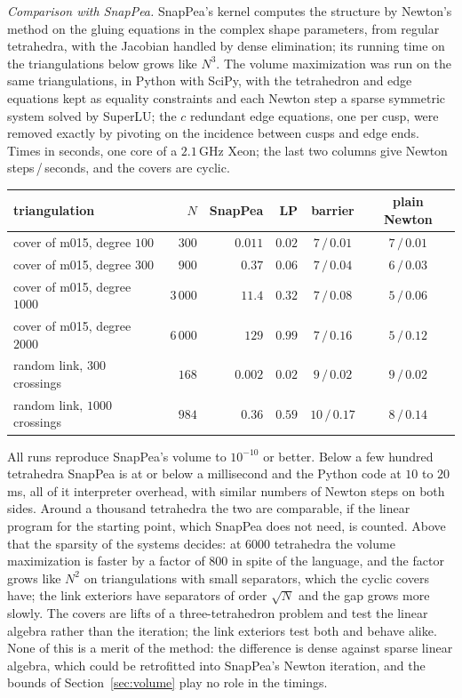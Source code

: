\documentclass[11pt]{amsart}
\theoremstyle{definition}
\theoremstyle{remark}
\begin{document}
\emph{Comparison with SnapPea.} SnapPea's kernel computes the structure by Newton's method on the gluing equations in the complex shape parameters, from regular tetrahedra, with the Jacobian handled by dense elimination; its running time on the triangulations below grows like $N^3$.
The volume maximization was run on the same triangulations, in Python with SciPy, with the tetrahedron and edge equations kept as equality constraints and each Newton step a sparse symmetric system solved by SuperLU; the $c$ redundant edge equations, one per cusp, were removed exactly by pivoting on the incidence between cusps and edge ends. Times in seconds, one core of a $2.1$\,GHz Xeon; the last two columns give Newton steps\,/\,seconds, and the covers are cyclic.

\medskip
\begin{center}
\small
\begin{tabular}{@{}lrrrcc@{}}
\toprule
triangulation & $N$ & SnapPea & LP & barrier & plain Newton\\
\midrule
cover of m015, degree $100$ & $300$ & $0.011$ & $0.02$ & $7\,/\,0.01$ & $7\,/\,0.01$\\
cover of m015, degree $300$ & $900$ & $0.37$ & $0.06$ & $7\,/\,0.04$ & $6\,/\,0.03$\\
cover of m015, degree $1000$ & $3\,000$ & $11.4$ & $0.32$ & $7\,/\,0.08$ & $5\,/\,0.06$\\
cover of m015, degree $2000$ & $6\,000$ & $129$ & $0.99$ & $7\,/\,0.16$ & $5\,/\,0.12$\\
random link, $300$ crossings & $168$ & $0.002$ & $0.02$ & $9\,/\,0.02$ & $9\,/\,0.02$\\
random link, $1000$ crossings & $984$ & $0.36$ & $0.59$ & $10\,/\,0.17$ & $8\,/\,0.14$\\
\bottomrule
\end{tabular}
\end{center}
\medskip

\noindent All runs reproduce SnapPea's volume to $10^{-10}$ or better. Below a few hundred tetrahedra SnapPea is at or below a millisecond and the Python code at $10$ to $20$\,ms, all of it interpreter overhead, with similar numbers of Newton steps on both sides.
Around a thousand tetrahedra the two are comparable, if the linear program for the starting point, which SnapPea does not need, is counted. Above that the sparsity of the systems decides: at $6000$ tetrahedra the volume maximization is faster by a factor of $800$ in spite of the language, and the factor grows like $N^2$ on triangulations with small separators, which the cyclic covers have; the link exteriors have separators of order $\sqrt N$ and the gap grows more slowly.
The covers are lifts of a three-tetrahedron problem and test the linear algebra rather than the iteration; the link exteriors test both and behave alike. None of this is a merit of the method: the difference is dense against sparse linear algebra, which could be retrofitted into SnapPea's Newton iteration, and the bounds of Section~\ref{sec:volume} play no role in the timings.
\end{document}

